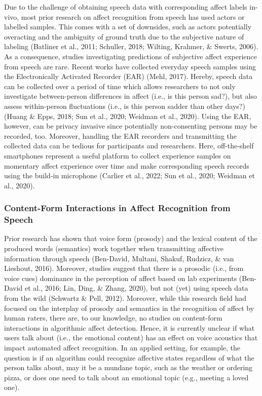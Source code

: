 \documentclass[
  man,floatsintext]{apa6}
\begin{document}
Due to the challenge of obtaining speech data with corresponding affect labels in-vivo, most prior research on affect recognition from speech has used actors or labelled samples. This comes with a set of downsides, such as actors potentially overacting and the ambiguity of ground truth due to the subjective nature of labeling (Batliner et al., 2011; Schuller, 2018; Wilting, Krahmer, \& Swerts, 2006). As a consequence, studies investigating predictions of subjective affect experience from speech are rare. Recent works have collected everyday speech samples using the Electronically Activated Recorder (EAR) (Mehl, 2017). Hereby, speech data can be collected over a period of time which allows researchers to not only investigate between-person differences in affect (i.e., is this person sad?), but also assess within-person fluctuations (i.e., is this person sadder than other days?) (Huang \& Epps, 2018; Sun et al., 2020; Weidman et al., 2020). Using the EAR, however, can be privacy invasive since potentially non-consenting persons may be recorded, too. Moreover, handling the EAR recorders and transmitting the collected data can be tedious for participants and researchers.
Here, off-the-shelf smartphones represent a useful platform to collect experience samples on momentary affect experience over time and make corresponding speech records using the build-in microphone (Carlier et al., 2022; Sun et al., 2020; Weidman et al., 2020).

\hypertarget{content-form-interactions-in-affect-recognition-from-speech}{%
\subsubsection{Content-Form Interactions in Affect Recognition from Speech}\label{content-form-interactions-in-affect-recognition-from-speech}}

Prior research has shown that voice form (prosody) and the lexical content of the produced words (semantics) work together when transmitting affective information through speech (Ben-David, Multani, Shakuf, Rudzicz, \& van Lieshout, 2016). Moreover, studies suggest that there is a prosodic (i.e., from voice cues) dominance in the perception of affect based on lab experiments (Ben-David et al., 2016; Lin, Ding, \& Zhang, 2020), but not (yet) using speech data from the wild (Schwartz \& Pell, 2012). Moreover, while this research field had focused on the interplay of prosody and semantics in the recognition of affect by human raters, there are, to our knowledge, no studies on content-form interactions in algorithmic affect detection. Hence, it is currently unclear if what users talk about (i.e., the emotional content) has an effect on voice acoustics that impact automated affect recognition. In an applied setting, for example, the question is if an algorithm could recognize affective states regardless of what the person talks about, may it be a mundane topic, such as the weather or ordering pizza, or does one need to talk about an emotional topic (e.g., meeting a loved one).
\end{document}
